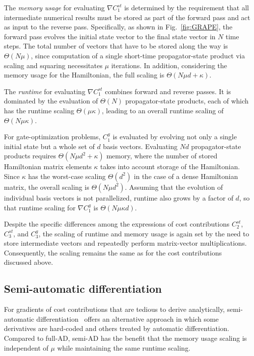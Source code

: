 The \textit{memory usage} for evaluating $\nabla C_1^{st}$ is determined by the requirement that all intermediate numerical results must be stored as part of the forward pass and act as input to the reverse pass. Specifically, as shown in Fig.~\ref{fig:GRAPE}, the forward pass evolves the initial state vector to the final state vector in $N$ time steps. The total number of vectors that have to be stored along the way is $\Theta
(N\mu)$, since computation of a single short-time propagator-state product via scaling and squaring necessitates $\mu$ iterations. In addition, considering the memory usage for the Hamiltonian, the full scaling is $\Theta(N\mu d +\kappa)$.

The \textit{runtime} for evaluating $\nabla C_1^{st}$ combines forward and reverse passes. It is dominated by the evaluation of $\Theta(N)$ propagator-state products, each of which has the runtime scaling $\Theta(\mu\kappa)$, leading to an overall runtime scaling of $\Theta(N\mu \kappa )$.

For gate-optimization problems, $C_1^{ g}$ is evaluated by evolving not only a single initial state but a whole set of $d$ basis vectors. Evaluating $Nd$ propagator-state products requires $\Theta(N\mu d^2+\kappa)$ memory, where the number of stored Hamiltonian matrix elements $\kappa$ takes into account storage of the Hamiltonian. Since $\kappa$ has the worst-case scaling $\Theta(d^2)$ in the case of a dense Hamiltonian matrix, the overall scaling is $\Theta(N\mu d^2)$. Assuming that the evolution of individual basis vectors is not parallelized, runtime also grows by a factor of $d$, so that runtime scaling for $\nabla C_1^{ g}$ is $\Theta(N\mu\kappa d)$.

Despite the specific differences among the expressions of cost contributions $C_2^{st}$, $C_3^{st}$, and $C_3^{g}$, the scaling of runtime and memory usage is again set by the need to store intermediate vectors and repeatedly perform matrix-vector multiplications. Consequently, the scaling remains the same as for the cost contributions discussed above.

\subsection{Semi-automatic differentiation}
\label{subsec:scale-semi-ad}

For gradients of cost contributions that are tedious to derive analytically, semi-automatic differentiation~\cite{semiadgoerz2022quantum} offers an alternative approach in which some derivatives are hard-coded and others treated by automatic differentiation. Compared to full-AD, semi-AD has the benefit that the memory usage scaling is independent of $\mu$ while maintaining the same runtime scaling.


